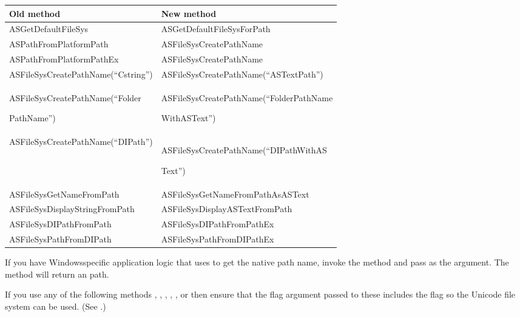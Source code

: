 \documentclass[letterpaper,12pt,english,openany,oneside]{sphinxmanual}
\begin{document}
\begin{savenotes}\sphinxattablestart
\centering
\begin{tabulary}{\linewidth}[t]{|T|T|}
\hline
\sphinxstyletheadfamily 
Old method
&\sphinxstyletheadfamily 
New method
\\
\hline
ASGetDefaultFileSys
&
ASGetDefaultFileSysForPath
\\
\hline
ASPathFromPlatformPath
&
ASFileSysCreatePathName
\\
\hline
ASPathFromPlatformPathEx
&
ASFileSysCreatePathName
\\
\hline
ASFileSysCreatePathName(“Cstring”)
&
ASFileSysCreatePathName(“ASTextPath”)
\\
\hline
ASFileSysCreatePathName(“Folder

PathName”)
&
ASFileSysCreatePathName(“FolderPathName

WithASText”)
\\
\hline
ASFileSysCreatePathName(“DIPath”)
&
ASFileSysCreatePathName(“DIPathWithAS

Text”)
\\
\hline
ASFileSysGetNameFromPath
&
ASFileSysGetNameFromPathAsASText
\\
\hline
ASFileSysDisplayStringFromPath
&
ASFileSysDisplayASTextFromPath
\\
\hline
ASFileSysDIPathFromPath
&
ASFileSysDIPathFromPathEx
\\
\hline
ASFileSysPathFromDIPath
&
ASFileSysPathFromDIPathEx
\\
\hline
\end{tabulary}
\par
\sphinxattableend\end{savenotes}

If you have Windows\sphinxhyphen{}specific application logic that uses  to get the native path name, invoke the  method and pass  as the  argument. The  method will return an  path.

If you use any of the following methods , , , , , or  then ensure that the flag argument passed to these includes the  flag so the Unicode file system can be used. (See .)
\end{document}
